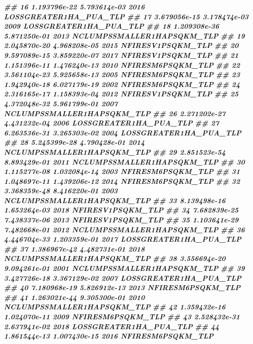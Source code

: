 \documentclass[10pt,landscape,a3paper]{article}
\newenvironment{Shaded}{\begin{snugshade}}{\end{snugshade}}
\newcommand{\DocumentationTok}[1]{\textcolor[rgb]{0.56,0.35,0.01}{\textbf{\textit{#1}}}}
\begin{document}
\begin{Shaded}
\begin{Highlighting}[]
\DocumentationTok{\#\# 16 1.193796e{-}22 5.793614e{-}03 2016     LOSSGREATER1HA\_PUA\_TLP}
\DocumentationTok{\#\# 17 3.679056e{-}15 3.178474e{-}03 2009     LOSSGREATER1HA\_PUA\_TLP}
\DocumentationTok{\#\# 18 1.209308e{-}36 5.871250e{-}01 2013 NCLUMPSSMALLER1HAPSQKM\_TLP}
\DocumentationTok{\#\# 19 2.045870e{-}20 4.968208e{-}05 2015          NFIRESV1PSQKM\_TLP}
\DocumentationTok{\#\# 20 9.597089e{-}15 3.859220e{-}07 2017          NFIRESV1PSQKM\_TLP}
\DocumentationTok{\#\# 21 1.151396e{-}11 1.476240e{-}13 2010          NFIRESM6PSQKM\_TLP}
\DocumentationTok{\#\# 22 3.561104e{-}23 5.925658e{-}13 2005          NFIRESM6PSQKM\_TLP}
\DocumentationTok{\#\# 23 1.942940e{-}18 6.027179e{-}19 2002          NFIRESM6PSQKM\_TLP}
\DocumentationTok{\#\# 24 2.316165e{-}17 1.158393e{-}04 2012          NFIRESV1PSQKM\_TLP}
\DocumentationTok{\#\# 25 4.372048e{-}32 5.961799e{-}01 2007 NCLUMPSSMALLER1HAPSQKM\_TLP}
\DocumentationTok{\#\# 26 2.271202e{-}27 4.431232e{-}04 2006     LOSSGREATER1HA\_PUA\_TLP}
\DocumentationTok{\#\# 27 6.263536e{-}31 3.265303e{-}02 2004     LOSSGREATER1HA\_PUA\_TLP}
\DocumentationTok{\#\# 28 5.245399e{-}28 4.790428e{-}01 2014 NCLUMPSSMALLER1HAPSQKM\_TLP}
\DocumentationTok{\#\# 29 2.851523e{-}54 8.893429e{-}01 2011 NCLUMPSSMALLER1HAPSQKM\_TLP}
\DocumentationTok{\#\# 30 1.115277e{-}08 1.032084e{-}14 2003          NFIRESM6PSQKM\_TLP}
\DocumentationTok{\#\# 31 1.048697e{-}11 1.439206e{-}12 2014          NFIRESM6PSQKM\_TLP}
\DocumentationTok{\#\# 32 3.368359e{-}48 8.416220e{-}01 2003 NCLUMPSSMALLER1HAPSQKM\_TLP}
\DocumentationTok{\#\# 33 8.139498e{-}16 1.653264e{-}03 2018          NFIRESV1PSQKM\_TLP}
\DocumentationTok{\#\# 34 7.682839e{-}25 7.438337e{-}06 2013          NFIRESV1PSQKM\_TLP}
\DocumentationTok{\#\# 35 1.103641e{-}29 7.482668e{-}01 2012 NCLUMPSSMALLER1HAPSQKM\_TLP}
\DocumentationTok{\#\# 36 4.446704e{-}33 1.203359e{-}01 2017     LOSSGREATER1HA\_PUA\_TLP}
\DocumentationTok{\#\# 37 1.386967e{-}42 4.482731e{-}01 2018 NCLUMPSSMALLER1HAPSQKM\_TLP}
\DocumentationTok{\#\# 38 3.556694e{-}20 9.094261e{-}01 2001 NCLUMPSSMALLER1HAPSQKM\_TLP}
\DocumentationTok{\#\# 39 3.427726e{-}18 3.367129e{-}02 2007     LOSSGREATER1HA\_PUA\_TLP}
\DocumentationTok{\#\# 40 7.180968e{-}19 5.826912e{-}13 2013          NFIRESM6PSQKM\_TLP}
\DocumentationTok{\#\# 41 1.263021e{-}44 9.305300e{-}01 2010 NCLUMPSSMALLER1HAPSQKM\_TLP}
\DocumentationTok{\#\# 42 1.359432e{-}16 1.024070e{-}11 2009          NFIRESM6PSQKM\_TLP}
\DocumentationTok{\#\# 43 2.528432e{-}31 2.637941e{-}02 2018     LOSSGREATER1HA\_PUA\_TLP}
\DocumentationTok{\#\# 44 1.861544e{-}13 1.007430e{-}15 2016          NFIRESM6PSQKM\_TLP}

\end{Highlighting}
\end{Shaded}
\end{document}
